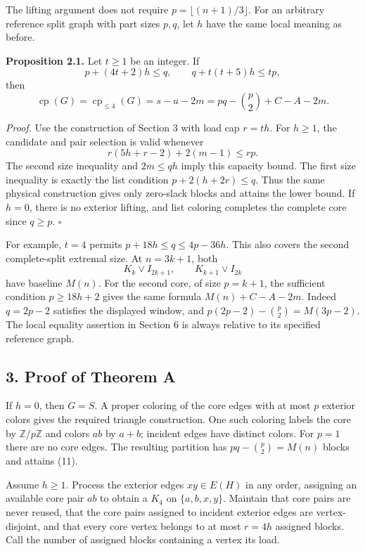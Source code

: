 \documentclass[english,11pt,a4paper]{article}
\begin{document}
The lifting argument does not require \(p=\lfloor(n+1)/3\rfloor\). For
an arbitrary reference split graph with part sizes \(p,q\), let \(h\)
have the same local meaning as before.

\textbf{Proposition 2.1.} Let \(t\ge1\) be an integer. If \[
p+(4t+2)h\le q,\qquad q+t(t+5)h\le tp,
\] then \[
\operatorname{cp}(G)=\operatorname{cp}_{\le4}(G)
=s-u-2m=pq-\binom p2+C-A-2m.
\]

\emph{Proof.} Use the construction of Section 3 with load cap \(r=th\).
For \(h\ge1\), the candidate and pair selection is valid whenever \[
r(5h+r-2)+2(m-1)\le rp.
\] The second size inequality and \(2m\le qh\) imply this capacity
bound. The first size inequality is exactly the list condition
\(p+2(h+2r)\le q\). Thus the same physical construction gives only
zero-slack blocks and attains the lower bound. If \(h=0\), there is no
exterior lifting, and list coloring completes the complete core since
\(q\ge p\). \(\square\)

For example, \(t=4\) permits \(p+18h\le q\le4p-36h\). This also covers
the second complete-split extremal size. At \(n=3k+1\), both \[
K_k\vee I_{2k+1},\qquad K_{k+1}\vee I_{2k}
\] have baseline \(M(n)\). For the second core, of size \(p=k+1\), the
sufficient condition \(p\ge18h+2\) gives the same formula
\(M(n)+C-A-2m\). Indeed \(q=2p-2\) satisfies the displayed window, and
\(p(2p-2)-\binom p2=M(3p-2)\). The local equality assertion in Section 6
is always relative to its specified reference graph.

\subsection{3. Proof of Theorem A}\label{proof-of-theorem-a}

If \(h=0\), then \(G=S\). A proper coloring of the core edges with at
most \(p\) exterior colors gives the required triangle construction. One
such coloring labels the core by \(\mathbb Z/p\mathbb Z\) and colors
\(ab\) by \(a+b\); incident edges have distinct colors. For \(p=1\)
there are no core edges. The resulting partition has
\(pq-\binom p2=M(n)\) blocks and attains (11).

Assume \(h\ge1\). Process the exterior edges \(xy\in E(H)\) in any
order, assigning an available core pair \(ab\) to obtain a \(K_4\) on
\(\{a,b,x,y\}\). Maintain that core pairs are never reused, that the
core pairs assigned to incident exterior edges are vertex-disjoint, and
that every core vertex belongs to at most \(r=4h\) assigned blocks. Call
the number of assigned blocks containing a vertex its load.
\end{document}

